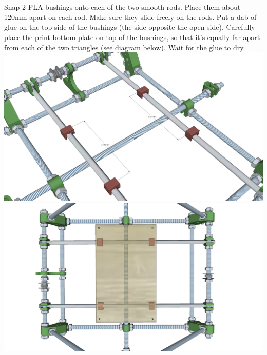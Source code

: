 \documentclass[twoside,openany,a4paper,titlepage]{memoir}
\begin{document}
	\section{}
	Snap 2 PLA bushings onto each of the two smooth rods. Place them about 120mm apart on each rod.
	Make sure they slide freely on the rods. Put a dab of glue on the top side of the bushings (the side
	opposite the open side). Carefully place the print bottom plate on top of the bushings, so that it's equally
	far apart from each of the two triangles (see diagram below). Wait for the glue to dry.\\
	\includegraphics[width=1\linewidth]{graphics/ch6_11_1.png}
	\includegraphics[width=1\linewidth]{graphics/ch6_11_2.png}
	
\end{document}
